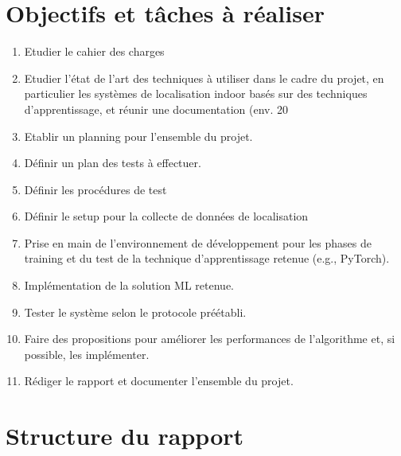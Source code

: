 \section{Objectifs et tâches à réaliser}
\begin{enumerate}
	\item Etudier le cahier des charges
	\item Etudier l’état de l’art des techniques à utiliser dans le cadre du projet, en particulier les systèmes de localisation indoor basés sur des techniques d’apprentissage, et réunir une documentation (env. 20%
	\item Etablir un planning pour l’ensemble du projet.
	\item Définir un plan des tests à effectuer.
	\item Définir les procédures de test
	\item Définir le setup pour la collecte de données de localisation
	\item Prise en main de l’environnement de développement pour les phases de training et du test de la technique d’apprentissage retenue (e.g., PyTorch).
	\item Implémentation de la solution ML retenue.
	\item Tester le système selon le protocole préétabli.
	\item Faire des propositions pour améliorer les performances de l’algorithme et, si possible, les implémenter.
	\item Rédiger le rapport et documenter l’ensemble du projet.
\end{enumerate}

\section{Structure du rapport}







